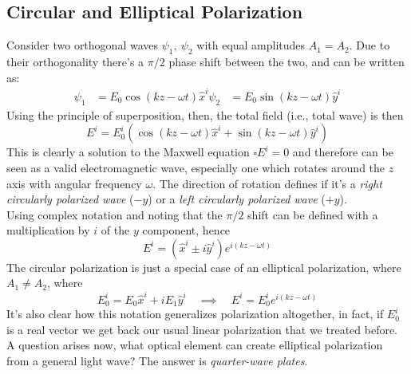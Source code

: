 \documentclass[../electromagnetism.tex]{subfiles}
\begin{document}
\subsection{Circular and Elliptical Polarization}
Consider two orthogonal waves $\psi_1,\ \psi_2$ with equal amplitudes $A_1=A_2$. Due to their orthogonality there's a $\pi/2$ phase shift between the two, and can be written as:
\begin{equation}
	\begin{aligned}
		\psi_1&=E_0\cos\left( kz-\omega t \right)\hat{x}^i
		\psi_2&=E_0\sin\left( kz-\omega t \right)\hat{y}^i
	\end{aligned}
	\label{eq:circpol2waves}
\end{equation}
Using the principle of superposition, then, the total field (i.e., total wave) is then
\begin{equation}
	E^i=E_0^i\left( \cos\left( kz-\omega t \right)\hat{x}^i+\sin\left( kz-\omega t \right)\hat{y}^i \right)
	\label{eq:totfieldcircular}
\end{equation}
This is clearly a solution to the Maxwell equation $\square E^i=0$ and therefore can be seen as a valid electromagnetic wave, especially one which rotates around the $z$ axis with angular frequency $\omega$. The direction of rotation defines if it's a \textit{right circularly polarized wave} ($-y$) or a \textit{left circularly polarized wave} ($+y$).\\
Using complex notation and noting that the $\pi/2$ shift can be defined with a multiplication by $i$ of the $y$ component, hence
\begin{equation}
	E^i=\left( \hat{x}^i\pm i\hat{y}^i \right)e^{i\left( kz-\omega t \right)}
	\label{eq:circpol}
\end{equation}
The circular polarization is just a special case of an elliptical polarization, where $A_1\ne A_2$, where
\begin{equation}
	E_0^i=E_0\hat{x}^i+iE_1\hat{y}^i\quad\implies\quad E^i=E_0^ie^{i\left( kz-\omega t \right)}
	\label{eq:complexwaveelpol}
\end{equation}
It's also clear how this notation generalizes polarization altogether, in fact, if $E_0^i$ is a real vector we get back our usual linear polarization that we treated before.\\
A question arises now, what optical element can create elliptical polarization from a general light wave? The answer is \textit{quarter-wave plates}.
\end{document}

